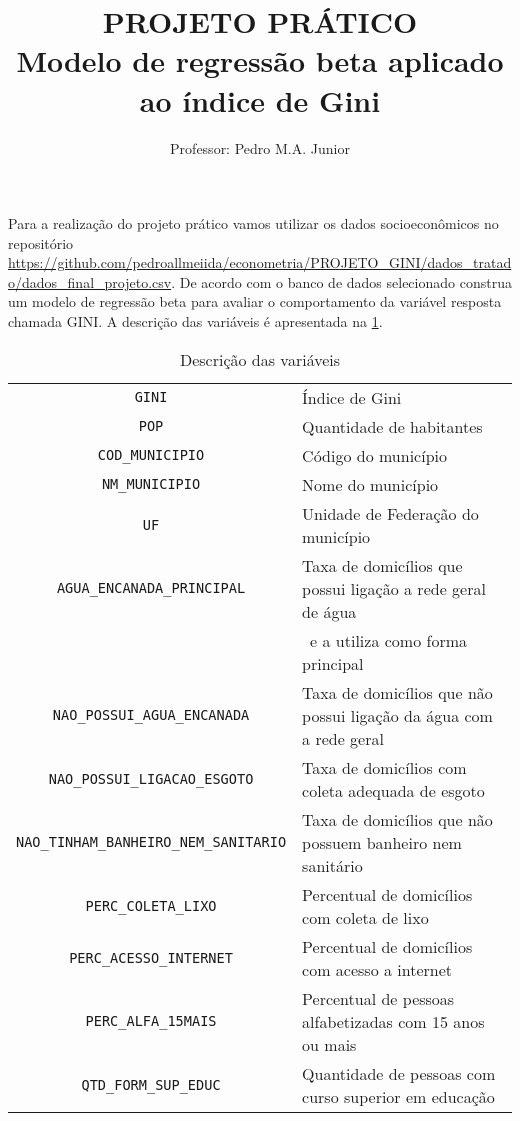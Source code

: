 \documentclass[thmsa,11pt]{article}
\begin{document}
\author{Professor: Pedro M.A. Junior}
\title{PROJETO PRÁTICO \\ Modelo de regressão beta aplicado ao índice de Gini}


\maketitle


Para a realização do projeto prático vamos utilizar os dados socioeconômicos no repositório \url{https://github.com/pedroallmeiida/econometria/PROJETO_GINI/dados_tratado/dados_final_projeto.csv}. 
De acordo com o banco de dados selecionado construa um modelo de regressão beta para avaliar o comportamento da variável resposta chamada GINI. A descrição das variáveis é apresentada na \ref{tab:descricao}. 

\begin{table}[htb!]
	\tiny
	\caption{Descrição das variáveis}\label{tab:descricao}	
	\centering
	\begin{tabular}{|c|l|}
		\hline
		\verb|GINI| & Índice de Gini \\
		\verb|POP| & Quantidade de habitantes \\ 
		\verb|COD_MUNICIPIO| & Código do município \\
		\verb|NM_MUNICIPIO| & Nome do município \\
		\verb|UF| & Unidade de Federação do município \\
		\verb|AGUA_ENCANADA_PRINCIPAL| & Taxa de domicílios que possui ligação a rede geral de água  \\
		& \, e a utiliza como forma principal \\
		\verb|NAO_POSSUI_AGUA_ENCANADA| & Taxa de domicílios que não possui ligação da água com a rede geral \\
		\verb|NAO_POSSUI_LIGACAO_ESGOTO| & Taxa de domicílios com coleta adequada de esgoto \\
		\verb|NAO_TINHAM_BANHEIRO_NEM_SANITARIO| & Taxa de domicílios que não possuem banheiro nem sanitário \\
		\verb|PERC_COLETA_LIXO| & Percentual de domicílios com coleta de lixo\\
		\verb|PERC_ACESSO_INTERNET| & Percentual de domicílios com acesso a internet \\
		\verb|PERC_ALFA_15MAIS| & Percentual de pessoas alfabetizadas com 15 anos ou mais\\
		\verb|QTD_FORM_SUP_EDUC| & Quantidade de pessoas com curso superior em educação \\

\end{tabular}
\end{table}
\end{document}
